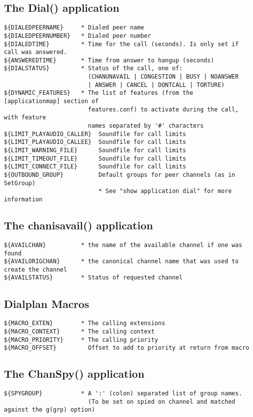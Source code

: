 \subsection{The Dial() application}
\begin{verbatim}
${DIALEDPEERNAME}     * Dialed peer name
${DIALEDPEERNUMBER}   * Dialed peer number
${DIALEDTIME}         * Time for the call (seconds). Is only set if call was answered.
${ANSWEREDTIME}       * Time from answer to hangup (seconds)
${DIALSTATUS}         * Status of the call, one of:
                        (CHANUNAVAIL | CONGESTION | BUSY | NOANSWER
                        | ANSWER | CANCEL | DONTCALL | TORTURE)
${DYNAMIC_FEATURES}   * The list of features (from the [applicationmap] section of
                        features.conf) to activate during the call, with feature
                        names separated by '#' characters
${LIMIT_PLAYAUDIO_CALLER}  Soundfile for call limits
${LIMIT_PLAYAUDIO_CALLEE}  Soundfile for call limits
${LIMIT_WARNING_FILE}      Soundfile for call limits
${LIMIT_TIMEOUT_FILE}      Soundfile for call limits
${LIMIT_CONNECT_FILE}      Soundfile for call limits
${OUTBOUND_GROUP}          Default groups for peer channels (as in SetGroup)
                           * See "show application dial" for more information
\end{verbatim}

\subsection{The chanisavail() application}
\begin{verbatim}
${AVAILCHAN}          * the name of the available channel if one was found
${AVAILORIGCHAN}      * the canonical channel name that was used to create the channel
${AVAILSTATUS}        * Status of requested channel
\end{verbatim}

\subsection{Dialplan Macros}
\begin{verbatim}
${MACRO_EXTEN}        * The calling extensions
${MACRO_CONTEXT}      * The calling context
${MACRO_PRIORITY}     * The calling priority
${MACRO_OFFSET}         Offset to add to priority at return from macro
\end{verbatim}

\subsection{The ChanSpy() application}
\begin{verbatim}
${SPYGROUP}           * A ':' (colon) separated list of group names.
                        (To be set on spied on channel and matched against the g(grp) option)
\end{verbatim}

